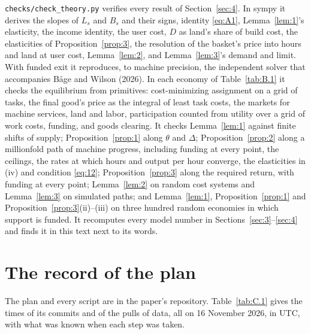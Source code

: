 \documentclass[12pt]{article}
\theoremstyle{plain}
\begin{document}
\texttt{checks/check\_theory.py} verifies every result of Section~\ref{sec:4}. In sympy it derives the slopes of $L_s$ and $B_s$ and their signs, identity \eqref{eq:A1}, Lemma~\ref{lem:1}'s elasticity, the income identity, the user cost, $D$ as land's share of build cost, the elasticities of Proposition~\ref{prop:3}, the resolution of the basket's price into hours and land at user cost, Lemma~\ref{lem:2}, and Lemma~\ref{lem:3}'s demand and limit. With funded exit it reproduces, to machine precision, the independent solver that accompanies B\r{a}ge and Wilson (2026). In each economy of Table~\ref{tab:B.1} it checks the equilibrium from primitives: cost-minimizing assignment on a grid of tasks, the final good's price as the integral of least task costs, the markets for machine services, land and labor, participation counted from utility over a grid of work costs, funding, and goods clearing. It checks Lemma~\ref{lem:1} against finite shifts of supply; Proposition~\ref{prop:1} along $\theta$ and $\Delta$; Proposition~\ref{prop:2} along a millionfold path of machine progress, including funding at every point, the ceilings, the rates at which hours and output per hour converge, the elasticities in (iv) and condition \eqref{eq:12}; Proposition~\ref{prop:3} along the required return, with funding at every point; Lemma~\ref{lem:2} on random cost systems and Lemma~\ref{lem:3} on simulated paths; and Lemma~\ref{lem:1}, Proposition~\ref{prop:1} and Proposition~\ref{prop:3}(ii)--(iii) on three hundred random economies in which support is funded. It recomputes every model number in Sections~\ref{sec:3}--\ref{sec:4} and finds it in this text next to its words.

\section{The record of the plan}\label{app:C}

The plan and every script are in the paper's repository. Table~\ref{tab:C.1} gives the times of its commits and of the pulls of data, all on 16 November 2026, in UTC, with what was known when each step was taken.
\end{document}
